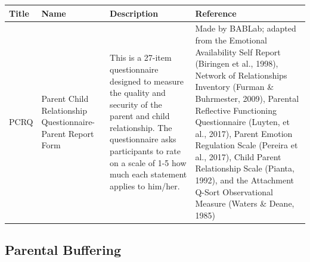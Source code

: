 \documentclass[]{book}
\begin{document}
\begin{longtable}[]{@{}llll@{}}
\toprule
\begin{minipage}[b]{0.14\columnwidth}\raggedright
Title\strut
\end{minipage} & \begin{minipage}[b]{0.18\columnwidth}\raggedright
Name\strut
\end{minipage} & \begin{minipage}[b]{0.20\columnwidth}\raggedright
Description\strut
\end{minipage} & \begin{minipage}[b]{0.37\columnwidth}\raggedright
Reference\strut
\end{minipage}\tabularnewline
\midrule
\endhead
\begin{minipage}[t]{0.14\columnwidth}\raggedright
PCRQ\strut
\end{minipage} & \begin{minipage}[t]{0.18\columnwidth}\raggedright
Parent Child Relationship Questionnaire- Parent Report Form\strut
\end{minipage} & \begin{minipage}[t]{0.20\columnwidth}\raggedright
This is a 27-item questionnaire designed to measure the quality and security of the parent and child relationship. The questionnaire asks participants to rate on a scale of 1-5 how much each statement applies to him/her.\strut
\end{minipage} & \begin{minipage}[t]{0.37\columnwidth}\raggedright
Made by BABLab; adapted from the Emotional Availability Self Report (Biringen et al., 1998), Network of Relationships Inventory (Furman \& Buhrmester, 2009), Parental Reflective Functioning Questionnaire (Luyten, et al., 2017), Parent Emotion Regulation Scale (Pereira et al., 2017), Child Parent Relationship Scale (Pianta, 1992), and the Attachment Q-Sort Observational Measure (Waters \& Deane, 1985)\strut
\end{minipage}\tabularnewline
\bottomrule
\end{longtable}

\hypertarget{parental-buffering}{%
\subsection{Parental Buffering}\label{parental-buffering}}
\end{document}

